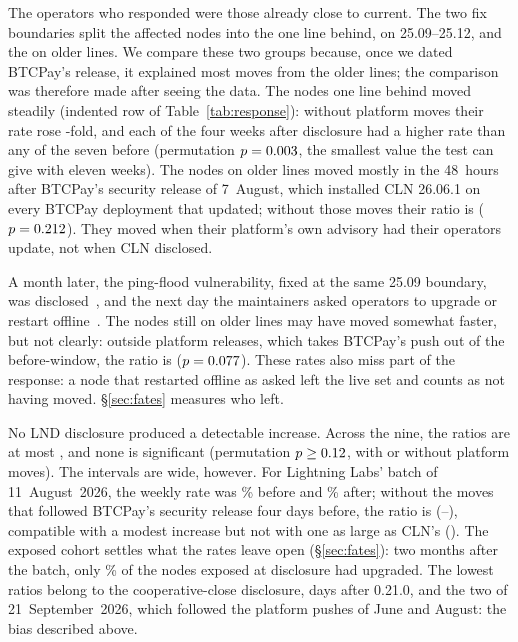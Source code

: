 The operators who responded were those already close to current. The two fix boundaries split the affected nodes
into the \AtRiskClnRecent{} one line behind, on 25.09--25.12, and the \AtRiskClnConnectd{} on older lines. We compare
these two groups because, once we dated BTCPay's release, it explained most moves from the older lines; the
comparison was therefore made after seeing the data. The nodes one line behind moved steadily (indented row of
Table~\ref{tab:response}): without platform moves their rate rose \RROpClnRecent-fold, and each of the four weeks
after disclosure had a higher rate than any of the seven before (permutation $p=0.003$, the smallest
value the test can give with eleven weeks). The nodes on older lines moved mostly in the 48~hours after BTCPay's
security release of 7~August, which installed CLN 26.06.1 on every BTCPay deployment that updated; without those
moves their ratio is \RROpClnConnectd{} ($p=0.212$). They moved when their platform's own advisory had
their operators update, not when CLN disclosed.

A month later, the ping-flood vulnerability, fixed at the same 25.09 boundary, was
disclosed~\cite{cestari2026pingflood}, and the next day the maintainers asked operators to upgrade or restart
offline~\cite{coreln2026offline}. The \AtRiskClnPing{} nodes still on older lines may have moved somewhat faster, but
not clearly: outside platform releases, which takes BTCPay's push out of the before-window, the ratio is
\RROpClnPing{} ($p=0.077$). These rates also miss part of the response: a node that restarted offline as
asked left the live set and counts as not having moved. \S\ref{sec:fates} measures who left.

No LND disclosure produced a detectable increase. Across the nine, the ratios are at most \RespLndMaxRR{}, and
none is significant (permutation $p\geq0.12$, with or without platform moves). The intervals are wide,
however. For Lightning Labs' batch of 11~August~2026, the weekly rate was \WkBeforeAllLLBatch\% before and
\WkAfterAllLLBatch\% after; without the moves that followed BTCPay's security release four days before, the ratio is
\RROpLLBatch{} (\RRLoOpLLBatch--\RRHiOpLLBatch), compatible with a modest increase but not with one as large as
CLN's (\RROpClnRecent). The exposed cohort settles what the rates leave open (\S\ref{sec:fates}): two months after
the batch, only \PctCohortUpLLBatch\% of the nodes exposed at disclosure had upgraded. The lowest ratios belong to the cooperative-close disclosure, \FixToDiscLndCloseconf{} days after 0.21.0,
and the two of 21~September~2026, which followed the platform pushes of June and August: the bias described above.

